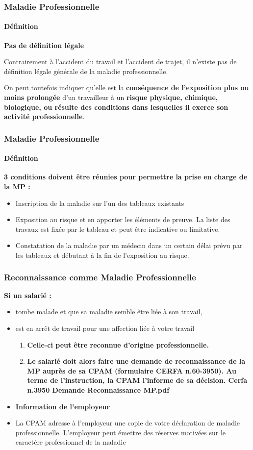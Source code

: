 \documentclass{beamer}
\begin{document}

\begin{frame}
\frametitle{Maladie Professionnelle}
\framesubtitle{Définition}

\textbf{Pas de définition légale}

Contrairement à l'accident du travail et l'accident de trajet, il n'existe pas de définition légale générale de la maladie professionnelle. 

On peut toutefois indiquer qu'elle est la \textbf{conséquence de l'exposition plus ou moins prolongée} d’un travailleur à un \textbf{risque physique, chimique, biologique, ou résulte des conditions dans lesquelles il exerce son activité professionnelle}.
\end{frame} 



\begin{frame}
\frametitle{Maladie Professionnelle}
\framesubtitle{Définition}

\textbf{3 conditions doivent être réunies pour permettre la prise en charge de la MP :}
\begin{itemize}
\item  Inscription de la maladie sur l’un des tableaux existants 
\item  Exposition au risque et en apporter les éléments de preuve. La liste des travaux est fixée par le tableau et peut être indicative ou limitative.
\item  Constatation de la maladie par un médecin dans un certain délai prévu par les tableaux et débutant à la fin de l'exposition au risque.
\end{itemize}
\end{frame} 

\begin{frame}
\frametitle{Reconnaissance comme Maladie Professionnelle}

\textbf{Si un salarié :}
\begin{itemize}
\item tombe malade et que sa maladie semble être liée à son travail, 
\item est en arrêt de travail pour une affection liée à votre travail
\begin{enumerate}
\item \textbf{Celle-ci peut être reconnue d'origine professionnelle.} 
\item \textbf{Le salarié doit alors faire une demande de reconnaissance de la MP auprès de sa CPAM (formulaire CERFA n.60-3950). Au terme de l'instruction, la CPAM l’informe de sa décision.
Cerfa n.3950 Demande Reconnaissance MP.pdf}
\end{enumerate}

\item \textbf{Information de l'employeur}
\item La CPAM adresse à l’employeur une copie de votre déclaration de maladie professionnelle. L'employeur peut émettre des réserves motivées sur le caractère professionnel de la maladie
\end{itemize}
\end{frame} 
\end{document}
